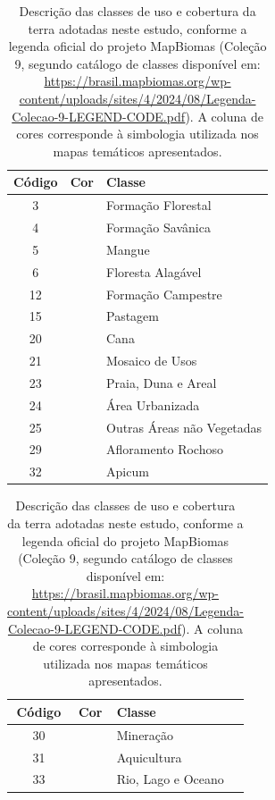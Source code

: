 \begin{table}[H]
\centering
\caption[Classes de uso e cobertura da terra do MapBiomas.]
{Descrição das classes de uso e cobertura da terra adotadas neste estudo, conforme a legenda oficial do projeto MapBiomas (Coleção 9, segundo catálogo de classes disponível em: \url{https://brasil.mapbiomas.org/wp-content/uploads/sites/4/2024/08/Legenda-Colecao-9-LEGEND-CODE.pdf}). A coluna de cores corresponde à simbologia utilizada nos mapas temáticos apresentados.}
\label{tab:mapbiomas_classes}
\begin{minipage}{0.48\textwidth}
\centering
\begin{tabular}{c c l}
\hline
\textbf{Código} & \textbf{Cor} & \textbf{Classe} \\
\hline
3  & \cellcolor[RGB]{31, 141, 73}  & Formação Florestal \\
4  & \cellcolor[RGB]{125, 201, 117}  & Formação Savânica \\
5  & \cellcolor[RGB]{4, 56, 29}  & Mangue \\
6 & \cellcolor[RGB]{0, 119, 133}   & Floresta Alagável \\
12  & \cellcolor[RGB]{214, 188, 116} & Formação Campestre \\
15 & \cellcolor[RGB]{237, 222, 140} & Pastagem \\
20 & \cellcolor[RGB]{219, 112, 147}  & Cana \\
21 & \cellcolor[RGB]{255, 239, 195}   & Mosaico de Usos \\
23 & \cellcolor[RGB]{255, 160, 122} & Praia, Duna e Areal \\
24 & \cellcolor[RGB]{212, 39, 30}    & Área Urbanizada \\
25 & \cellcolor[RGB]{219, 77, 79}    & Outras Áreas não Vegetadas \\
29 & \cellcolor[RGB]{255, 170, 95}  & Afloramento Rochoso \\
32 & \cellcolor[RGB]{252, 129, 20}  & Apicum \\
\hline
\end{tabular}
\end{minipage}
\hfill
\begin{minipage}{0.48\textwidth}
\centering
\begin{tabular}{c c l}
\hline
\textbf{Código} & \textbf{Cor} & \textbf{Classe} \\
\hline
30 & \cellcolor[RGB]{156, 0, 39}  & Mineração \\
31 & \cellcolor[RGB]{9, 16, 119} & Aquicultura \\
33 & \cellcolor[RGB]{37, 50, 228}   & Rio, Lago e Oceano \\

\end{tabular}
\end{minipage}
\end{table}
